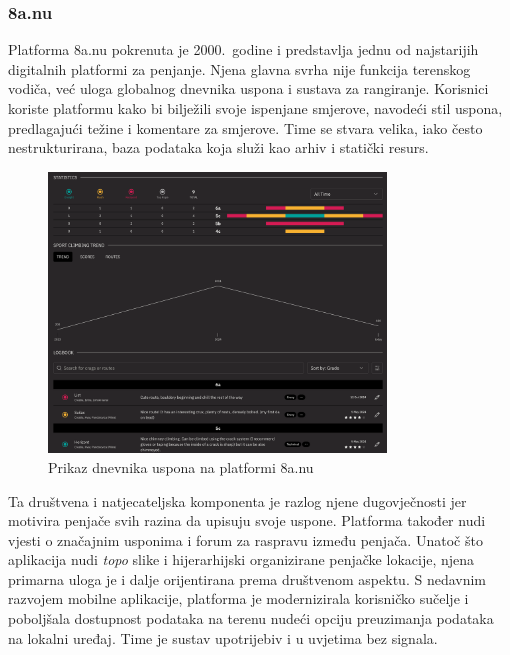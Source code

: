 \subsubsection{8a.nu}

Platforma 8a.nu pokrenuta je 2000.\ godine i predstavlja jednu od najstarijih digitalnih platformi za penjanje. Njena glavna svrha nije funkcija terenskog vodiča, već uloga globalnog dnevnika uspona i sustava za rangiranje. Korisnici koriste platformu kako bi bilježili svoje ispenjane smjerove, navodeći stil uspona, predlagajući težine i komentare za smjerove. Time se stvara velika, iako često nestrukturirana, baza podataka koja služi kao arhiv i statički resurs.

\begin{figure}[H]
    \centering
    \includegraphics[width=0.8\textwidth]{images/analiza/8anu_logbook.png}
    \caption{Prikaz dnevnika uspona na platformi 8a.nu}
\end{figure}

Ta društvena i natjecateljska komponenta je razlog njene dugovječnosti jer motivira penjače svih razina da upisuju svoje uspone. Platforma također nudi vjesti o značajnim usponima i forum za raspravu između penjača. Unatoč što aplikacija nudi \textit{topo} slike i hijerarhijski organizirane penjačke lokacije, njena primarna uloga je i dalje orijentirana prema društvenom aspektu. 
S nedavnim razvojem mobilne aplikacije, platforma je modernizirala korisničko sučelje i poboljšala dostupnost podataka na terenu nudeći opciju preuzimanja podataka na lokalni uređaj. Time je sustav upotrijebiv i u uvjetima bez signala.


